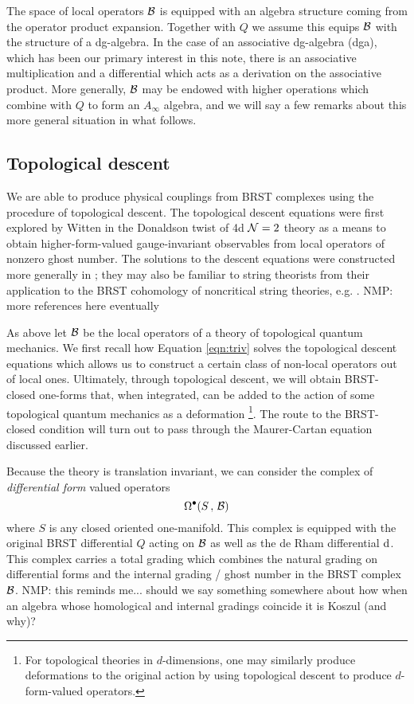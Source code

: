\documentclass[11pt]{amsart}
\def\natalie#1{{\textcolor{green!65!black}{NMP: {#1}}}}
\begin{document}
The space of local operators $\mathcal B$ is equipped with an algebra structure coming from the operator product expansion. 
Together with $Q$ we assume this equips $\mathcal B$ with the structure of a  dg-algebra. In the case of an associative dg-algebra (dga), which has been our primary interest in this note, there is an associative multiplication and a differential which acts as a derivation on the associative product. 
More generally, $\mathcal B$ may be endowed with higher operations which combine with $Q$ to form an $A_\infty$ algebra, and we will say a few remarks about this more general situation in what follows. 

\subsection{Topological descent}\label{sec:descent}
We are able to produce physical couplings from BRST complexes using the procedure of topological descent. The topological descent equations were first explored by Witten in the Donaldson twist of 4d $\mathcal N=2$ theory \cite{W88} as a means to obtain higher-form-valued gauge-invariant observables from local operators of nonzero ghost number. The solutions to the descent equations were constructed more generally in \cite{MW97}; they may also be familiar to string theorists from their application to the BRST cohomology of noncritical string theories, e.g. \cite{WZ92}. \natalie{more references here eventually}

As above let $\mathcal B$ be the local operators of a theory of topological quantum mechanics. 
We first recall how Equation \eqref{eqn:triv} solves the topological descent equations which allows us to construct a certain class of non-local operators out of local ones. Ultimately, through topological descent, we will obtain BRST-closed one-forms that, when integrated, can be added to the action of some topological quantum mechanics as a deformation \footnote{For topological theories in $d$-dimensions, one may similarly produce deformations to the original action by using topological descent to produce $d$-form-valued operators.}. The route to the BRST-closed condition will turn out to pass through the Maurer-Cartan equation discussed earlier. 

Because the theory is translation invariant, we can consider the complex of {\em differential form} valued operators
\[
\Omega^\bullet(S \, , \, \mathcal B) 
\]
where $S$ is any closed oriented one-manifold. 
This complex is equipped with the original BRST differential $Q$ acting on $\mathcal B$ as well as the de Rham differential ${\rm d}$. 
This complex carries a total grading which combines the natural grading on differential forms and the internal grading / ghost number in the BRST complex $\mathcal B$.  \natalie{this reminds me... should we say something somewhere about how when an algebra whose homological and internal gradings coincide it is Koszul (and why)?}
\end{document}
